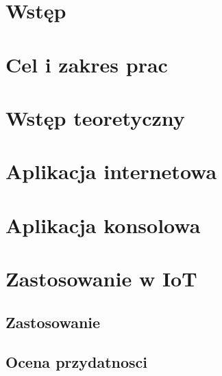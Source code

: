 \documentclass[11pt, a4paper,polish,twoside]{report}
\begin{document}



\newpage
\null
\thispagestyle{empty}
\newpage




\tableofcontents

\chapter{Wstęp}


\chapter{Cel i zakres prac}


\chapter{Wstęp teoretyczny}


\chapter{Aplikacja internetowa}


\chapter{Aplikacja konsolowa}


\chapter{Zastosowanie w IoT}
\section{Zastosowanie}
\section{Ocena przydatnosci}
\end{document}

